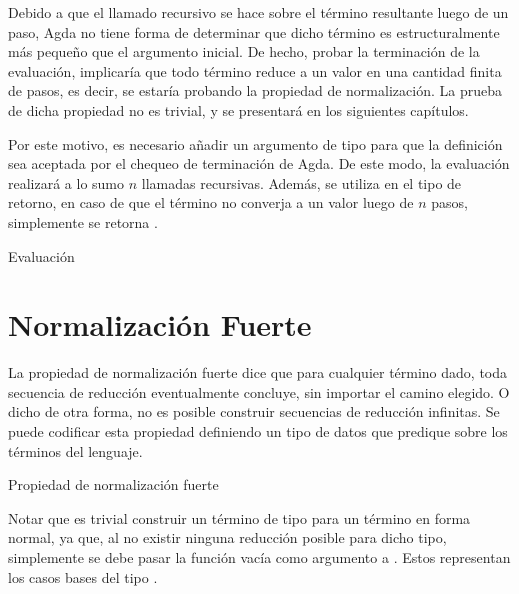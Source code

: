 \documentclass[]{report}
\begin{document}
	Debido a que el llamado recursivo se hace sobre el término resultante luego de un paso, Agda no tiene forma de determinar que dicho término es estructuralmente más pequeño que el argumento inicial.
	De hecho, probar la terminación de la evaluación, implicaría que todo término reduce a un valor en una cantidad finita de pasos, es decir, se estaría probando la propiedad de normalización.
	La prueba de dicha propiedad no es trivial, y se presentará en los siguientes capítulos.
	
	Por este motivo, es necesario añadir un argumento de tipo  para que la definición sea aceptada por el chequeo de terminación de Agda.
	De este modo, la evaluación realizará a lo sumo $n$ llamadas recursivas.
	Además, se utiliza  en el tipo de retorno, en caso de que el término no converja a un valor luego de $n$ pasos, simplemente se retorna .

	
	\begin{codigo}
		Evaluación
	\end{codigo}
	
	
	\section{Normalización Fuerte}
	
	La propiedad de normalización fuerte dice que para cualquier término dado, toda secuencia de reducción eventualmente concluye, sin importar el camino elegido.
	O dicho de otra forma, no es posible construir secuencias de reducción infinitas.
	Se puede codificar esta propiedad definiendo un tipo de datos que predique sobre los términos del lenguaje.
	
	\begin{codigo}
		Propiedad de normalización fuerte
		\ExecuteMetaData[code/strong_norm.tex]{SN}
	\end{codigo}
	
	Notar que es trivial construir un término de tipo  para un término en forma normal, ya que, al no existir ninguna reducción posible para dicho tipo, simplemente se debe pasar la función vacía como argumento a .
	Estos representan los casos bases del tipo .
	
\end{document}
